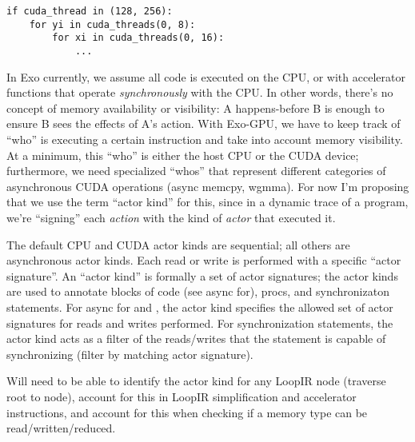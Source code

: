 {\color{lightttColor}
\begin{verbatim}
if cuda_thread in (128, 256):
    for yi in cuda_threads(0, 8):
        for xi in cuda_threads(0, 16):
            ...
\end{verbatim}
}

\filbreak
{} In Exo currently, we assume all code is executed on the CPU, or with accelerator functions that operate \textit{synchronously} with the CPU.
In other words, there's no concept of memory availability or visibility: A happens-before B is enough to ensure B sees the effects of A's action.
With Exo-GPU, we have to keep track of ``who'' is executing a certain instruction and take into account memory visibility.
At a minimum, this ``who'' is either the host CPU or the CUDA device; furthermore, we need specialized ``whos'' that represent different categories of asynchronous CUDA operations (async memcpy, wgmma).
For now I'm proposing that we use the term ``actor kind'' for this, since in a dynamic trace of a program, we're ``signing'' each \textit{action} with the kind of \textit{actor} that executed it.

\filbreak
The default CPU and CUDA actor kinds are sequential; all others are asynchronous actor kinds.
Each read or write is performed with a specific ``actor signature''.
An ``actor kind'' is formally a set of actor signatures; the actor kinds are used to annotate blocks of code (see async for),  procs, and synchronizaton statements.
For async for and , the actor kind specifies the allowed set of actor signatures for reads and writes performed.
For synchronization statements, the actor kind acts as a filter of the reads/writes that the statement is capable of synchronizing (filter by matching actor signature).

\filbreak
{} Will need to be able to identify the actor kind for any LoopIR node (traverse root to node), account for this in LoopIR simplification and accelerator instructions, and account for this when checking if a memory type can be read/written/reduced.


